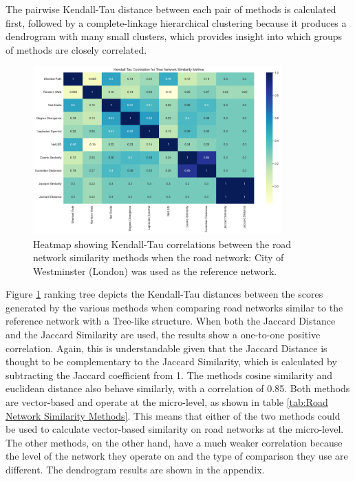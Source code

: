 The pairwise Kendall-Tau distance between each pair of methods is calculated first, followed by a complete-linkage hierarchical clustering because it produces a dendrogram with many small clusters, which provides insight into which groups of methods are closely correlated.

\begin{figure}[!ht]
\centering
\includegraphics[width=0.85\textwidth,center]{picture/Tree/tree2.png}
\caption[Heatmap showing Kendall-Tau correlations between the road network similarity methods for Radial Road Networks]{Heatmap showing Kendall-Tau correlations between the road network similarity methods when the road network: City of Westminster (London) was used as the reference network.}
\label{fig:network ranking tree}
\end{figure}

Figure \ref{fig:network ranking tree} ranking tree depicts the Kendall-Tau distances between the scores generated by the various methods when comparing road networks similar to the reference network with a Tree-like structure. When both the Jaccard Distance and the Jaccard Similarity are used, the results show a one-to-one positive correlation. Again, this is understandable given that the Jaccard Distance is thought to be complementary to the Jaccard Similarity, which is calculated by subtracting the Jaccard coefficient from 1. The methods cosine similarity and euclidean distance also behave similarly, with a correlation of 0.85. Both methods are vector-based and operate at the micro-level, as shown in table \ref{tab:Road Network Similarity Methods}. This means that either of the two methods could be used to calculate vector-based similarity on road networks at the micro-level. The other methods, on the other hand, have a much weaker correlation because the level of the network they operate on and the type of comparison they use are different. The dendrogram results are shown in the appendix.

